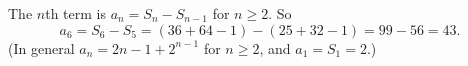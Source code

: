 The $n$th term is $a_n=S_n-S_{n-1}$ for $n\ge2$. So
\[a_6=S_6-S_5=\left(36+64-1\right)-\left(25+32-1\right)=99-56=\boxed{43}.\]
(In general $a_n=2n-1+2^{n-1}$ for $n\ge2$, and $a_1=S_1=2$.)
